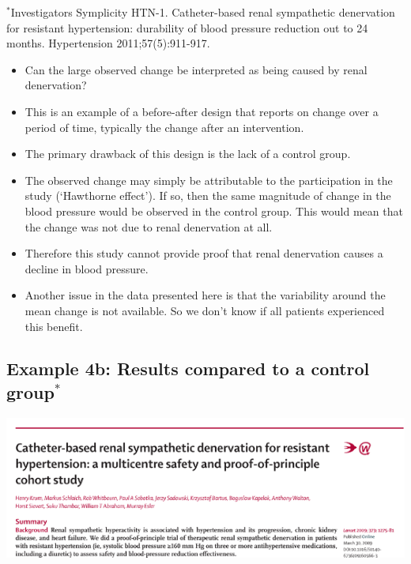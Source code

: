\documentclass[
]{book}
\providecommand{\tightlist}{%
  \setlength{\itemsep}{0pt}\setlength{\parskip}{0pt}}
\begin{document}
\(^*\)Investigators Symplicity HTN-1. Catheter-based renal sympathetic denervation for resistant hypertension: durability of blood pressure reduction out to 24 months. Hypertension 2011;57(5):911-917.

\begin{itemize}
\tightlist
\item
  Can the large observed change be interpreted as being caused by renal denervation?
\item
  This is an example of a before-after design that reports on change over a period of time, typically the change after an intervention.
\item
  The primary drawback of this design is the lack of a control group.
\item
  The observed change may simply be attributable to the participation in the study (`Hawthorne effect'). If so, then the same magnitude of change in the blood pressure would be observed in the control group. This would mean that the change was not due to renal denervation at all.
\item
  Therefore this study cannot provide proof that renal denervation causes a decline in blood pressure.
\item
  Another issue in the data presented here is that the variability around the mean change is not available. So we don't know if all patients experienced this benefit.
\end{itemize}

\hypertarget{example-4b-results-compared-to-a-control-group}{%
\subsection{\texorpdfstring{Example 4b: Results compared to a control group\(^*\)}{Example 4b: Results compared to a control group\^{}*}}\label{example-4b-results-compared-to-a-control-group}}

\includegraphics[width=1\linewidth]{./1_31}
\end{document}
